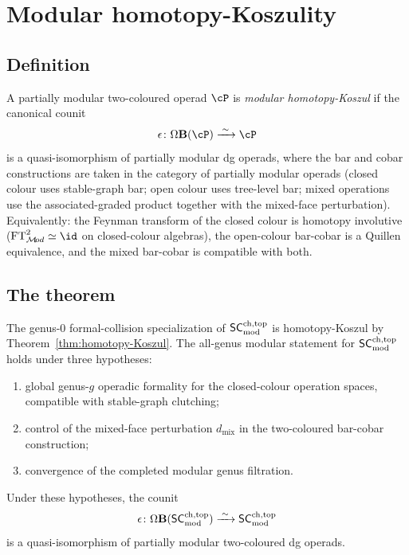 \section{Modular homotopy-Koszulity}
\label{sec:modular-homotopy-koszulity}

\subsection{Definition}
\label{subsec:mod-hkoszul-def}

\begin{definition}
\label{def:modular-hkoszul}
A partially modular two-coloured operad $\cP$ is \emph{modular
homotopy-Koszul} if the canonical counit
\[
 \epsilon \colon \Omega\mathbf{B}(\cP) \xrightarrow{\;\sim\;} \cP
\]
is a quasi-isomorphism of partially modular dg operads, where the bar
and cobar constructions are taken in the category of partially modular
operads (closed colour uses stable-graph bar; open colour uses
tree-level bar; mixed operations use the associated-graded product
together with the mixed-face perturbation).
Equivalently: the Feynman transform of the closed colour is homotopy
involutive ($\FTmod^2 \simeq \id$ on closed-colour algebras), the
open-colour bar-cobar is a Quillen equivalence, and the mixed bar-cobar
is compatible with both.
\end{definition}


\subsection{The theorem}
\label{subsec:mod-hkoszul-thm}

\begin{theorem}
\label{thm:modular-hkoszul-SC}
The genus-$0$ formal-collision specialization of $\mathsf{SC}^{\mathrm{ch,top}}_{\mathrm{mod}}$ is
homotopy-Koszul by Theorem~\ref{thm:homotopy-Koszul}. The
all-genus modular statement for $\mathsf{SC}^{\mathrm{ch,top}}_{\mathrm{mod}}$ holds under three hypotheses:
\begin{enumerate}[label=\textup{(\roman*)}]
\item global genus-$g$ operadic formality for the closed-colour
 operation spaces, compatible with stable-graph clutching;
\item control of the mixed-face perturbation $d_{\mathrm{mix}}$
 in the two-coloured bar-cobar construction;
\item convergence of the completed modular genus filtration.
\end{enumerate}
Under these hypotheses, the counit
\[
 \epsilon \colon
 \Omega\mathbf{B}(\mathsf{SC}^{\mathrm{ch,top}}_{\mathrm{mod}}) \xrightarrow{\;\sim\;} \mathsf{SC}^{\mathrm{ch,top}}_{\mathrm{mod}}
\]
is a quasi-isomorphism of partially modular two-coloured dg operads.
\end{theorem}

